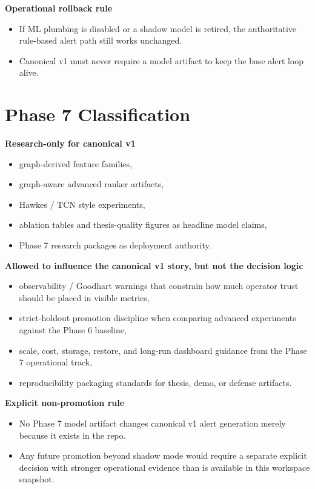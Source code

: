 \documentclass{article}
\begin{document}
\textbf{Operational rollback rule}
\begin{itemize}
\item If ML plumbing is disabled or a shadow model is retired, the authoritative rule-based alert path still works unchanged.
\item Canonical v1 must never require a model artifact to keep the base alert loop alive.
\end{itemize}

\section*{Phase 7 Classification}
\textbf{Research-only for canonical v1}
\begin{itemize}
\item graph-derived feature families,
\item graph-aware advanced ranker artifacts,
\item Hawkes / TCN style experiments,
\item ablation tables and thesis-quality figures as headline model claims,
\item Phase 7 research packages as deployment authority.
\end{itemize}

\textbf{Allowed to influence the canonical v1 story, but not the decision logic}
\begin{itemize}
\item observability / Goodhart warnings that constrain how much operator trust should be placed in visible metrics,
\item strict-holdout promotion discipline when comparing advanced experiments against the Phase 6 baseline,
\item scale, cost, storage, restore, and long-run dashboard guidance from the Phase 7 operational track,
\item reproducibility packaging standards for thesis, demo, or defense artifacts.
\end{itemize}

\textbf{Explicit non-promotion rule}
\begin{itemize}
\item No Phase 7 model artifact changes canonical v1 alert generation merely because it exists in the repo.
\item Any future promotion beyond shadow mode would require a separate explicit decision with stronger operational evidence than is available in this workspace snapshot.
\end{itemize}
\end{document}
